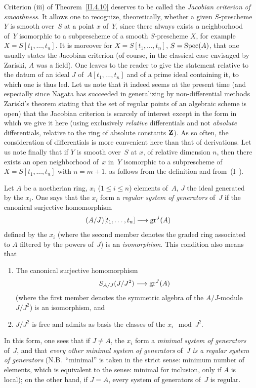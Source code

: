 \begin{remarks}
\label{II.4.14}
Criterion (iii) of Theorem~\ref{II.4.10} deserves to be called
the \emph{Jacobian criterion of smoothness}.
It allows one to recognize, theoretically, whether a given
$S$-prescheme $Y$ is smooth over~$S$ at a point $x$
of~$Y$, since there always exists a neighborhood of~$Y$ isomorphic to
a subprescheme of a smooth $S$-prescheme $X$, for
example $X=S[t_1,\dots,t_n]$. It is moreover for
$X=S[t_1,\dots,t_n]$, $S=\operatorname{Spec}(A)$, that one usually states the
Jacobian criterion
(of course, in the classical case envisaged by Zariski, $A$ was
a field). One leaves to the reader to give the statement relative
to the datum of an ideal $J$ of~$A[t_1,\dots,t_n]$ and of a
prime ideal containing it, to which one is thus led. Let us note
that it indeed seems at the present time (and especially since Nagata
has succeeded in generalizing by
non-differential methods Zariski's theorem stating that
the set of regular points of an algebraic scheme is
open) that the Jacobian criterion is scarcely of interest
except in the form in which we give it here (\ie using
exclusively \emph{relative} differentials and not
\emph{absolute} differentials, \ie relative to the ring of
absolute constants $\mathbf{Z}$). As so often, the consideration
of differentials is more convenient here than that of
derivations. Let us note finally that if $Y$ is smooth over~$S$ at $x$, of
relative dimension $n$, then there exists an open neighborhood of~$x$
in~$Y$ isomorphic to a subprescheme of
$X=S[t_1,\dots,t_n]$ with $n=m+1$, as follows from the
definition and
from~(I~).

Let $A$ be a noetherian ring, $x_i$ ($1 \leq i \leq n$)
elements of~$A$, $J$ the ideal generated by the
$x_i$. One says that the $x_i$ form a \emph{regular
system of generators}
of~$J$ if the canonical surjective homomorphism
\[
(A/J)[t_1,\dots,t_n] \to \gr^J(A)
\]
defined by the $x_i$ (where the second member denotes
the graded ring associated to $A$ filtered by the
powers of~$J$) is an \emph{isomorphism}. This condition
also means that
\begin{enumerate}
\item[(i)] The canonical surjective homomorphism
\[
S_{A/J} (J/J^2) \to \gr^J(A)
\]
(where the first member denotes the symmetric algebra of the
$A/J$-module $J/J^2$) is an isomorphism, and
\item[(ii)] $J/J^2$ is free and admits as basis the classes of the $x_i
\mod J^2$.
\end{enumerate}
In this form, one sees that if $J\neq A$, the $x_i$ form a
\emph{minimal system of generators} of~$J$, and that
\emph{every other minimal system of generators} of~$J$
\emph{is a regular system of generators}
(N.B.\ ``minimal'' is taken in the strict sense: minimum number
of elements, which is equivalent to the sense: minimal for
inclusion, only if $A$ is local); on the other hand, if $J=A$, every
system of generators of~$J$ is regular.


\end{remarks}
